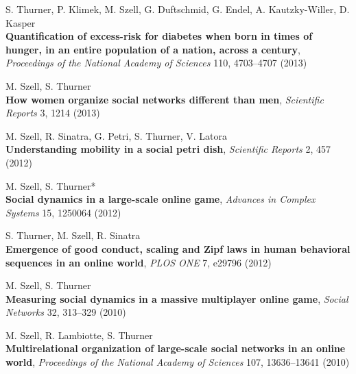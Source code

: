 \documentclass[10pt,a4paper]{article}
\renewenvironment{itemize}{
  \begin{list}{}{
    \setlength{\leftmargin}{1.5em}
    \setlength{\itemsep}{0.25em}
    \setlength{\parskip}{0pt}
    \setlength{\parsep}{0.25em}
  }
}{
  \end{list}
}
\begin{document}
\begin{itemize}
\item S. Thurner, P. Klimek, M. Szell, G. Duftschmid, G. Endel, A. Kautzky-Willer, D. Kasper\\
    \textbf{Quantification of excess-risk for diabetes when born in times of hunger, in an entire population of a nation, across a century}, \textit{Proceedings of the National Academy of Sciences} 110, 4703--4707 (2013)
\item M. Szell, S. Thurner\\
    \textbf{How women organize social networks different than men}, \textit{Scientific Reports} 3, 1214 (2013)
\item M. Szell, R. Sinatra, G. Petri, S. Thurner, V. Latora\\
    \textbf{Understanding mobility in a social petri dish}, \textit{Scientific Reports} 2, 457 (2012)
\item M. Szell, S. Thurner*\\
    \textbf{Social dynamics in a large-scale online game}, \textit{Advances in Complex Systems} 15, 1250064 (2012)
\item S. Thurner, M. Szell, R. Sinatra\\
    \textbf{Emergence of good conduct, scaling and Zipf laws in human behavioral sequences in an online world}, \textit{PLOS ONE} 7, e29796 (2012)
\item M. Szell, S. Thurner\\
    \textbf{Measuring social dynamics in a massive multiplayer online game}, \textit{Social Networks} 32, 313--329 (2010)
\item M. Szell, R. Lambiotte, S. Thurner\\
    \textbf{Multirelational organization of large-scale social networks in an online world}, \textit{Proceedings of the National Academy of Sciences} 107, 13636--13641 (2010)
\end{itemize}
\end{document}
